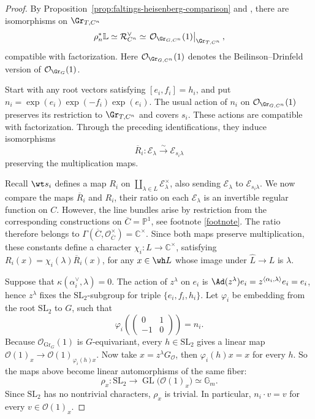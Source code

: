 \documentclass{amsart}
\numberwithin{equation}{section}
\numberwithin{figure}{section}
\theoremstyle{definition}
\theoremstyle{remark}
\renewcommand{\c}[1]{\mathcal{#1}}
\renewcommand{\b}[1]{\mathbb{#1}}
\renewcommand{\r}[1]{\mathrm{#1}}
\newcommand{\SL}{\r{SL}}
\begin{document}
\begin{proof}
	By Proposition~\ref{prop:faltings-heisenberg-comparison}
	and \cite[Lemma~3.3.1(ii)]{zhu2009affine}, there are
	isomorphisms on $\Gr_{T,C^n}$
	\[
	\rho_n^*\b L
	\simeq \c R_{C^n}^{\vee}
	\simeq
	\left.\c O_{\Gr_{G,C^n}}(1)\right|_{\Gr_{T,C^n}},
	\]
	compatible with factorization.
	Here $\c O_{\Gr_{G,C^n}}(1)$ denotes the
	Beilinson--Drinfeld version of $\c O_{\Gr_G}(1)$.
	
	Start with any root vectors satisfying
	$[e_i,f_i]=h_i$, and put
	$n_i=\exp(e_i)\exp(-f_i)\exp(e_i)$.
	The usual action of $n_i$ on
	$\c O_{\Gr_{G,C^n}}(1)$ preserves its restriction
	to $\Gr_{T,C^n}$ and covers $s_i$.
	These actions are compatible with factorization.
	Through the preceding identifications, they induce
	isomorphisms
	\[
	\overline R_i:\c E_\lambda
	\xrightarrow{\sim}\c E_{s_i\lambda}
	\]
	preserving the multiplication maps.
	
	Recall $\wt s_i$ defines a map $R_i$ on
	$\coprod_{\lambda\in L}	\c E_\lambda^\times$, also sending 
	$\c E_\lambda$ to $\c E_{s_i\lambda}$. We now compare the maps $\overline R_i$ and $R_i$, their ratio on each $\c E_\lambda$ is an invertible regular function on $C$.
	However, the line bundles arise by restriction from the corresponding
	constructions on $\overline C=\b P^1$, see footnote \ref{footnote}.
	The ratio therefore belongs to
	$\Gamma(\overline C,\c O_{\overline C}^{\times})
	=\b C^\times$.
	Since both maps preserve multiplication, these
	constants define a character
	$\chi_i:L\to\b C^\times$, satisfying $	R_i(x)=\chi_i(\lambda)\overline R_i(x)$, for any $x\in\wh L$ whose image under \(\widehat L\to L\) is \(\lambda\).
	
	Suppose that $\kappa(\alpha_i^\vee,\lambda)=0$.
	The action of $z^\lambda$ on $e_i$ is $\Ad(z^\lambda)e_i=z^{\left\langle \alpha_i,\lambda \right\rangle }e_i=e_i$, hence $z^\lambda$ fixes the $\mathrm{SL}_2$-subgroup for triple $\{e_i,f_i,h_i\}$. Let $\varphi_i$ be embedding from the root $\SL_2$ to $G$, such that  $$\varphi_i\left( \begin{pmatrix}0&1\\-1&0\end{pmatrix}\right) =n_i.$$ 
	Because \(\mathcal O_{\mathrm{Gr}_G}(1)\) is \(G\)-equivariant, every \(h\in\mathrm{SL}_2\) gives a linear map $\mathcal O(1)_x
	\longrightarrow
	\mathcal O(1)_{\varphi_i(h)x}.$
	Now take \(x=z^\lambda G_{\mathcal O}\), then \(\varphi_i(h)x=x\) for every \(h\). So the maps above become linear automorphisms of the same fiber:
	\[
	\rho_x:\mathrm{SL}_2
	\to
	\operatorname{GL}\bigl(\mathcal O(1)_x\bigr)
	\simeq\mathbb G_m.
	\]
	Since \(\mathrm{SL}_2\) has no nontrivial characters, \(\rho_x\) is trivial. In particular, $n_i\cdot v=v$ for every $v\in\mathcal O(1)_x$.
		

\end{proof}
\end{document}
